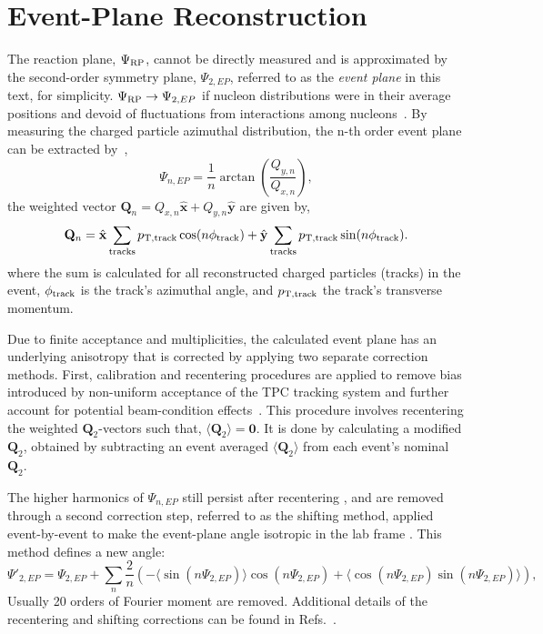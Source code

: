 \chapter{Event-Plane Reconstruction}
\label{sec:EP_Recon}
The reaction plane, \(\Psi_{\rm RP}\), cannot be directly measured and is approximated by the second-order symmetry plane, $\Psi_{2,EP}$, referred to as the \emph{event plane}  in this text, for simplicity.  
%
\(\Psi_{\rm RP} \to \Psi_{2, EP}\) if nucleon distributions were in their average positions and devoid of fluctuations from interactions among nucleons~\cite{PhysRevC.101.064901}.
%
By measuring the charged particle azimuthal distribution, the n-th order event plane can be extracted by~\cite{Poskanzer:1998yz},  
%
\begin{equation}
	\Psi_{n,EP} = \frac{1}{n} \arctan \left(\frac{Q_{y, n}}{Q_{x, n}} \right),
	\label{eqn:EP}
\end{equation}
%
the weighted vector \(\mathbf{Q}_n = Q_{x, n}\hat{\mathbf{x}}+ Q_{y, n}\hat{\mathbf{y}}\) are given by,
%
\begin{align}
	\mathbf{Q}_n = \hat{\mathbf{x}}\sum_{\mathrm{tracks}} p_{\rm T, track} \cos (n \phi_{\rm track}) + \hat{\mathbf{y}}\sum_{\mathrm{tracks}} p_{\rm T, track} \sin (n \phi_{\rm track}).
	\label{Eqn:Qvecs}
\end{align}
%
where the sum is calculated for all reconstructed charged particles (tracks) in the event, $\phi_{\rm track}$ is the track's azimuthal angle, and $p_{\rm T, track}$ the track's transverse momentum.  
%

Due to finite acceptance and multiplicities, the calculated event plane has an underlying anisotropy that is corrected by applying two separate correction methods.  
%
First, calibration and recentering procedures are applied to remove bias introduced by non-uniform acceptance of the TPC tracking system and further account for potential beam-condition effects~\cite{Barrette:1997pt,PhysRevC.55.1420,Poskanzer:1998yz}.  
%
This procedure involves recentering the weighted $\mathbf{Q}_2$-vectors such that, $\langle\mathbf{Q}_2 \rangle = \mathbf{0}$. 
%
It is done by calculating a modified $\mathbf{Q}_2$, obtained by subtracting an event averaged $\langle\mathbf{Q}_2 \rangle$ from each event's nominal $\mathbf{Q}_2$.
%

The higher harmonics of $\Psi_{n,EP}$ still persist after recentering \cite{Poskanzer:1998yz}, and are removed through a second correction step, referred to as  the shifting method, applied event-by-event  to make the event-plane angle isotropic in the lab frame \cite{Voloshin:2008dg}. 
%
This method defines a new angle:
%
\begin{equation}
	\Psi'_{2,EP} = \Psi_{2,EP} + \sum_n \frac{2}{n}
	(- \langle \sin (n\Psi_{2,EP}) \rangle \cos(n\Psi_{2,EP}) + \langle \cos(n\Psi_{2,EP}) \sin(n\Psi_{2,EP}) \rangle) ,
	\label{eqn:Shift}
\end{equation}
%
Usually 20 orders of Fourier moment are removed. 
%
Additional details of the recentering and shifting corrections can be found in Refs.~\cite{Wang:2012bga,Barrette:1997pt,Poskanzer:1998yz}.

